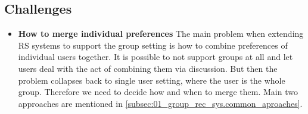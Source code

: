 \subsection{Challenges}\label{subsec:01_group_rec_sys.challenges}
\begin{itemize}
    \item \textbf{How to merge individual preferences} \newline
        The main problem when extending RS systems to support the group setting is how to combine preferences of individual users together. It is possible to not support groups at all and let users deal with the act of combining them via discussion. But then the problem collapses back to single user setting, where the user is the whole group. Therefore we need to decide how and when to merge them. Main two approaches are mentioned in \ref{subsec:01_group_rec_sys.common_aproaches}.
        
        

\end{itemize}
